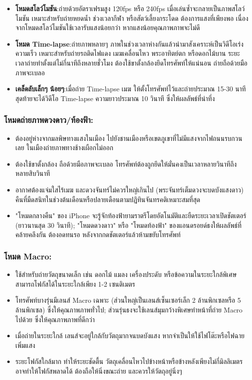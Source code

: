 \begin{itemize}
  \item \textbf{โหมดสโลว์โมชัน}:ถ่ายด้วยอัตราเฟรมสูง 120fps หรือ 240fps เมื่อเล่นซ้ำจะกลายเป็นภาพสโลว์โมชัน เหมาะสำหรับถ่ายหยดน้ำ ช่วงเวลากีฬา หรือสัตว์เลี้ยงกระโดด ต้องการแสงที่เพียงพอ เนื่องจากโหมดสโลว์โมชันใช้เวลารับแสงน้อยกว่า หากแสงน้อยคุณภาพภาพจะไม่ดี
  \item \textbf{โหมด Time-lapse}:ถ่ายภาพหลายๆ ภาพในช่วงเวลาห่างกันแล้วนำมาสังเคราะห์เป็นวิดีโอเร่งความเร็ว เหมาะสำหรับถ่ายรถติดไฟแดง เมฆเคลื่อนไหว พระอาทิตย์ตก หรือดอกไม้บาน ระยะเวลาถ่ายทำตั้งแต่ไม่กี่นาทีถึงหลายชั่วโมง ต้องใช้ขาตั้งกล้องยึดโทรศัพท์ให้แน่นอน ถ่ายถือด้วยมือภาพจะเบลอ
  \item \textbf{เคล็ดลับเล็กๆ น้อยๆ}:เมื่อถ่าย Time-lapse เมฆ ให้ตั้งโทรศัพท์ไว้และถ่ายประมาณ 15-30 นาที สุดท้ายจะได้วิดีโอ Time-lapse ความยาวประมาณ 10 วินาที ซึ่งให้ผลลัพธ์ที่น่าทึ่ง
\end{itemize}

\subsubsection*{โหมดถ่ายภาพดวงดาว/ท้องฟ้า:}

\begin{itemize}
  \item ต้องอยู่ห่างจากมลพิษทางแสงในเมือง ไปยังชานเมืองหรือเขตภูเขาที่ไม่มีแสงจากไฟถนนรบกวนเลย ในเมืองถ่ายภาพทางช้างเผือกไม่ออก
  \item ต้องใช้ขาตั้งกล้อง ถือด้วยมือภาพจะเบลอ โทรศัพท์ต้องถูกยึดให้มั่นคงเป็นเวลาหลายวินาทีถึงหลายสิบวินาที
  \item อากาศต้องแจ่มใสไร้เมฆ และดวงจันทร์ไม่ควรใหญ่เกินไป (พระจันทร์เต็มดวงจะบดบังแสงดาว) คืนที่มืดสนิทในช่วงต้นเดือนหรือปลายเดือนตามปฏิทินจันทรคติเหมาะสมที่สุด
  \item "โหมดกลางคืน" ของ iPhone จะรู้จักท้องฟ้ายามราตรีโดยอัตโนมัติและยืดระยะเวลาเปิดชัตเตอร์ (ยาวนานสุด 30 วินาที); "โหมดดวงดาว" หรือ "โหมดท้องฟ้า" ของแอนดรอยด์ธงให้ผลลัพธ์ที่คล้ายคลึงกัน ต้องอดทนรอ หลังจากกดชัตเตอร์แล้วห้ามขยับโทรศัพท์
\end{itemize}

\subsubsection*{โหมด Macro:}

\begin{itemize}
  \item ใช้สำหรับถ่ายวัตถุขนาดเล็ก เช่น ดอกไม้ แมลง เครื่องประดับ หรือข้อความในระยะใกล้พิเศษ สามารถโฟกัสได้ในระยะใกล้เพียง 1-2 เซนติเมตร
  \item โทรศัพท์บางรุ่นมีเลนส์ Macro เฉพาะ (ส่วนใหญ่เป็นเลนส์เซ็นเซอร์เล็ก 2 ล้านพิกเซลหรือ 5 ล้านพิกเซล) ซึ่งให้คุณภาพภาพทั่วไป; ส่วนรุ่นธงจะใช้เลนส์มุมกว้างพิเศษทำหน้าที่ถ่าย Macro ไปด้วย ซึ่งให้คุณภาพภาพที่ดีกว่า
  \item เมื่อถ่ายในระยะใกล้ เลนส์จะอยู่ใกล้กับวัตถุมากจนบดบังแสง หากจำเป็นให้ใช้ไฟโต๊ะหรือไฟฉายเพิ่มแสง
  \item ระยะโฟกัสใกล้มาก ทำให้ระยะชัดตื้น วัตถุเคลื่อนไหวไปข้างหน้าหรือข้างหลังเพียงไม่กี่มิลลิเมตรอาจทำให้โฟกัสพลาดได้ ต้องถือให้นิ่งขณะถ่าย และควรให้วัตถุอยู่นิ่งๆ
\end{itemize}

